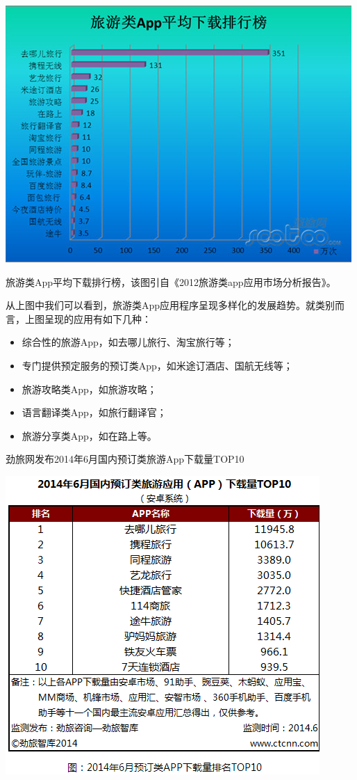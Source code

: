 \documentclass[12pt,a4paper]{article}
\begin{document}
\begin{CJK}{UTF8}{gbsn}
	\begin{center}
	\includegraphics[scale=0.8]{image1}
	\end{center}

	旅游类App平均下载排行榜，该图引自《2012旅游类app应用市场分析报告》。

	从上图中我们可以看到，旅游类App应用程序呈现多样化的发展趋势。就类别而言，上图呈现的应用有如下几种：
	\begin{itemize}
	\item 综合性的旅游App，如去哪儿旅行、淘宝旅行等；
	\item 专门提供预定服务的预订类App，如米途订酒店、国航无线等；
	\item 旅游攻略类App，如旅游攻略；
	\item 语言翻译类App，如旅行翻译官；
	\item 旅游分享类App，如在路上等。
	\end{itemize}

	劲旅网发布2014年6月国内预订类旅游App下载量TOP10
	\begin{center}
	\includegraphics[scale=0.8]{image2}
	\end{center}


\end{CJK}
\end{document}
